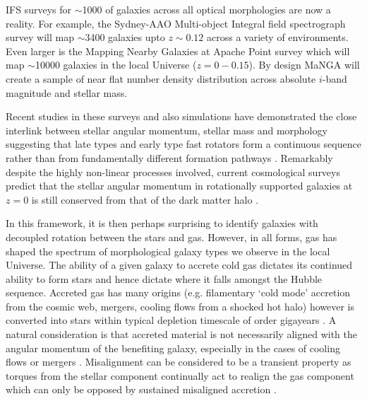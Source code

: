 \documentclass[fleqn,usenatbib]{mnras}
\begin{document}
IFS surveys for $\sim$1000 of galaxies across all optical morphologies are now a reality. For example, the Sydney-AAO  Multi-object  Integral  field  spectrograph  survey \citep[][]{croom2012, bryant2015} will map $\sim$3400 galaxies upto $z\sim0.12$ across a variety of environments. Even larger is the Mapping Nearby Galaxies at Apache Point \citep[MaNGA;][]{bundy2015, blanton2017} survey which will map $\sim$10000 galaxies in the local Universe ($z=0-0.15$). By design MaNGA will create a sample of near flat number density distribution across absolute $i$-band magnitude and stellar mass.

Recent studies in these surveys and also simulations have demonstrated the close interlink between stellar angular momentum, stellar mass and morphology suggesting that late types and early type fast rotators form a continuous sequence rather than from fundamentally different formation pathways \citep[][]{cortese2016, lagos2017, graham2018}. Remarkably despite the highly non-linear processes involved, current cosmological surveys predict that the stellar angular momentum in rotationally supported galaxies at $z=0$ is still conserved from that of the dark matter halo \citep[e.g.][]{genel2015}. 

In this framework, it is then perhaps surprising to identify galaxies with decoupled rotation between the stars and gas. However, in all forms, gas has shaped the spectrum of morphological galaxy types we observe in the local Universe. The ability of a given galaxy to accrete cold gas dictates its continued ability to form stars and hence dictate where it falls amongst the Hubble sequence. Accreted gas has many origins (e.g. filamentary `cold mode' accretion from the cosmic web, mergers, cooling flows from a shocked hot halo) however is converted into stars within typical depletion timescale of order gigayears \citep{davis2016}. A natural consideration is that accreted material is not necessarily aligned with the angular momentum of the benefiting galaxy, especially in the cases of cooling flows or mergers \citep[e.g.][]{davis2011, lagos2015}. Misalignment can be considered to be a transient property as torques from the stellar component continually act to realign the gas component which can only be opposed by sustained misaligned accretion \citep[][]{vdvoort2015, davis2016}. 
\end{document}
